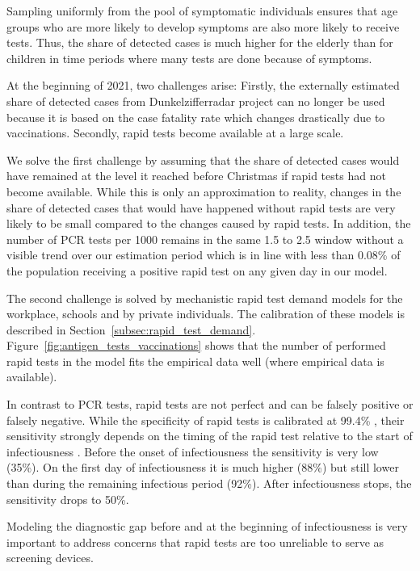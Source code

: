 Sampling uniformly from the pool of symptomatic individuals ensures that age groups who
are more likely to develop symptoms are also more likely to receive tests. Thus, the
share of detected cases is much higher for the elderly than for children in time periods
where many tests are done because of symptoms.

At the beginning of 2021, two challenges arise: Firstly, the externally estimated share
of detected cases from Dunkelzifferradar project \citep{Dunkelzifferradar2020} can no
longer be used because it is based on the case fatality rate which changes drastically
due to vaccinations. Secondly, rapid tests become available at a large scale.

We solve the first challenge by assuming that the share of detected cases would have 
remained at the level it reached before Christmas if rapid tests had not become 
available. While this is only an approximation to reality, changes in the share of 
detected cases that would have happened without rapid tests are very likely to be small 
compared to the changes caused by rapid tests. In addition, the number of PCR tests per 
1000 remains in the same 1.5 to 2.5 window without a visible trend over our estimation 
period \citep{owid_n_pcr_tests} which is in line with less than 0.08\% of the 
population receiving a positive rapid test on any given day in our model.

The second challenge is solved by mechanistic rapid test demand models for the
workplace, schools and by private individuals. The calibration of these models is
described in Section~\ref{subsec:rapid_test_demand}.
Figure~\ref{fig:antigen_tests_vaccinations} shows that the number of performed rapid
tests in the model fits the empirical data well (where empirical data is available).

In contrast to PCR tests, rapid tests are not perfect and can be falsely positive or
falsely negative. While the specificity of rapid tests is calibrated at 99.4\%
\citep{Bruemmer2021}, their sensitivity strongly depends on the timing of the rapid test
relative to the start of infectiousness \citep{Smith2021}. Before the onset of
infectiousness the sensitivity is very low (35\%). On the first day of infectiousness it
is much higher (88\%) but still lower than during the remaining infectious period (92\%).
After infectiousness stops, the sensitivity drops to 50\%.

Modeling the diagnostic gap before and at the beginning of infectiousness is very
important to address concerns that rapid tests are too unreliable to serve as screening
devices.

